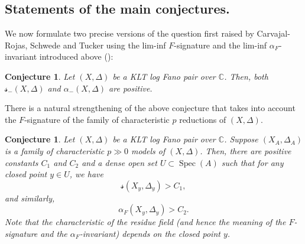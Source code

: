 \documentclass[11pt,reqno]{amsart}
\newcommand{\C}{\mathbb{C}}
\newcommand{\Q}{\mathbb{Q}}
\newcommand{\Z}{\mathbb{Z}}
\newcommand{\bC}{\mathbb{C}}
\newcommand{\bF}{\mathbb{F}}
\DeclareMathOperator{\Spec}{Spec}
\numberwithin{equation}{section}
\newtheorem{conj}[prop]{Conjecture}
\theoremstyle{definition}
\newcommand{\FA}{\alpha_{F}}
\newcommand{\s}{\mathscr{s}}
\begin{document}



\subsection{Statements of the main conjectures.}
We now formulate two precise versions of the question first raised by Carvajal-Rojas, Schwede and Tucker \cite[Question 5.9]{CarvajalRojasSchwedeTuckerFundamentalGroups} using the lim-inf $F$-signature and the lim-inf $\FA$-invariant introduced above ():
\begin{conj}\label{conj:alpha-lim-positive}
    Let $(X,\Delta)$ be a KLT log Fano pair over $\bC$. Then, both $\s_{-} (X, \Delta)$ and $\alpha_-(X,\Delta)$ are positive.
\end{conj}
There is a natural strengthening of the above conjecture that takes into account the $F$-signature of the family of characteristic $p$ reductions of $(X, \Delta)$.
\begin{conj} \label{strongerconjversion}
Let $(X, \Delta)$ be a KLT log Fano pair over $\C$. Suppose $(X_A, \Delta_A)$ is a family of characteristic $p \gg 0$ models of $(X, \Delta)$. Then, there are positive constants $C_1$ and $C_2$ and a dense open set $U \subset \Spec(A)$ such that for any closed point $y \in U$, we have
\[\s(X_y, \Delta_y) > C_1, \]
and similarly,
\[ \FA(X_y, \Delta_y) > C_2 . \]
Note that the characteristic of the residue field (and hence the meaning of the $F$-signature and the $\FA$-invariant) depends on the closed point $y$.
\end{conj}
\end{document}
